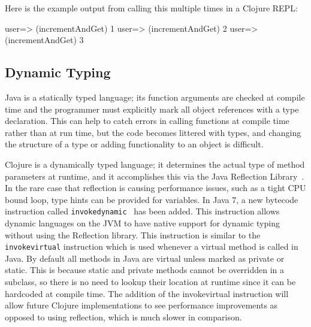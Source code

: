 Here is the example output from calling this multiple times in a
Clojure REPL:

user=> (incrementAndGet)
1
user=> (incrementAndGet)
2
user=> (incrementAndGet)
3
 
\subsection{Dynamic Typing}
Java is a statically typed language; its function arguments are
checked at compile time and the programmer must explicitly mark all
object references with a
type declaration. 
This can help to catch errors in calling functions at compile time
rather than at run time, but the code becomes littered with types, and
changing the structure of a type or adding functionality to an object
is difficult. 
    
Clojure is a dynamically typed language; it determines the actual type
of method parameters at runtime, and it accomplishes this via the Java
Reflection Library~\cite{reflection}. 
In the rare case that reflection is causing performance issues, such
as a tight CPU bound loop, type hints can be provided for variables. 
In Java 7, a new bytecode instruction called
{\tt invokedynamic}~\cite{invokedynamic} has been added.
This instruction allows dynamic
languages on the JVM to have native support for dynamic typing without
using the Reflection library. 
This instruction is similar to the {\tt invokevirtual} instruction which is
used whenever a virtual method is called in Java. 
By default all methods in Java are virtual unless marked as private or static. 
This is because static and private methods cannot be overridden in a
subclass, so there is no need to lookup their location at runtime
since it can be hardcoded at compile time. 
The addition of the invokevirtual instruction will allow future Clojure implementations to see performance improvements as opposed to using reflection, which is much slower in comparison.  

